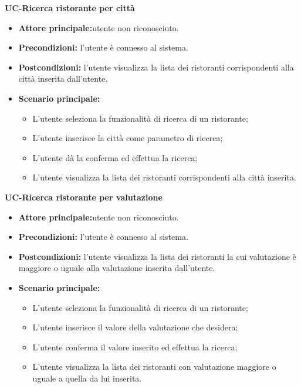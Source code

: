 \textbf{UC-Ricerca ristorante per città}
\begin{itemize}
\item \textbf{Attore principale:}utente non riconosciuto.
\item \textbf{Precondizioni:} l'utente è connesso al sistema.
\item \textbf{Postcondizioni:} l'utente visualizza la lista dei ristoranti corrispondenti alla città inserita
dall'utente.
\item \textbf{Scenario principale:}
\begin{itemize}
    \item L'utente seleziona la funzionalità di ricerca di un ristorante;
    \item L'utente inserisce la città come parametro di ricerca;
    \item L'utente dà la conferma ed effettua la ricerca;
    \item L'utente visualizza la lista dei ristoranti corrispondenti alla città inserita.
\end{itemize}
\end{itemize}

\textbf{UC-Ricerca ristorante per valutazione}
\begin{itemize}
\item \textbf{Attore principale:}utente non riconosciuto.
\item \textbf{Precondizioni:} l'utente è connesso al sistema.
\item \textbf{Postcondizioni:} l'utente visualizza la lista dei ristoranti la cui valutazione è maggiore o uguale alla
valutazione inserita dall'utente.
\item \textbf{Scenario principale:}
\begin{itemize}
    \item L'utente seleziona la funzionalità di ricerca di un ristorante;
    \item L'utente inserisce il valore della valutazione che desidera;
    \item L'utente conferma il valore inserito ed effettua la ricerca;
    \item  L'utente visualizza la lista dei ristoranti con valutazione maggiore o uguale a quella da lui inserita.
\end{itemize}
\end{itemize}


